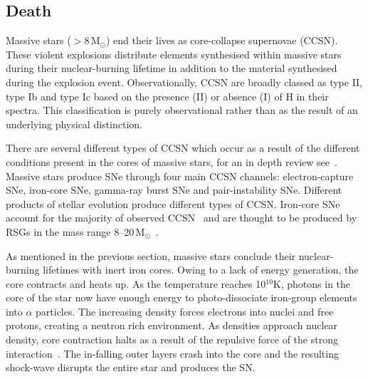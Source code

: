 
\subsection{Death} %
\label{sub:death}

Massive stars ($>$8\,M$_{\odot}$) end their lives as core-collapse supernovae (CCSN).
These violent explosions distribute elements synthesised within massive stars during their nuclear-burning lifetime in addition to the material synthesised during the explosion event.
Observationally, CCSN are broadly classed as type II, type Ib and type Ic based on the presence (II) or absence (I) of H in their spectra.\footnotemark
This classification is purely observational rather than as the result of an underlying physical distinction.


There are several different types of CCSN which occur as a result of the different conditions present in the cores of massive stars, for an in depth review see~\cite{Janka12}.
Massive stars produce SNe through four main CCSN channels: electron-capture SNe, iron-core SNe, gamma-ray burst SNe and pair-instability SNe.
Different products of stellar evolution produce different types of CCSN.
Iron-core SNe account for the majority of observed CCSN~\citep{Smartt09,Janka12,Eldridge13,2014ARA&A..52..487S} and are thought to be produced by RSGs in the mass range 8--20\,M$_{\odot}$~\citep{Poelarends08,Smartt09}.


As mentioned in the previous section, massive stars conclude their nuclear-burning lifetimes with inert iron cores.
Owing to a lack of energy generation, the core contracts and heats up.
As the temperature reaches 10$^{10}$K, photons in the core of the star now have enough energy to photo-dissociate iron-group elements into $\alpha$ particles.
The increasing density forces electrons into nuclei and free protons, creating a neutron rich environment.
As densities approach nuclear density, core contraction halts as a result of the repulsive force of the strong interaction~\citep{Janka12}.
The in-falling outer layers crash into the core and the resulting shock-wave disrupts the entire star and produces the SN.

